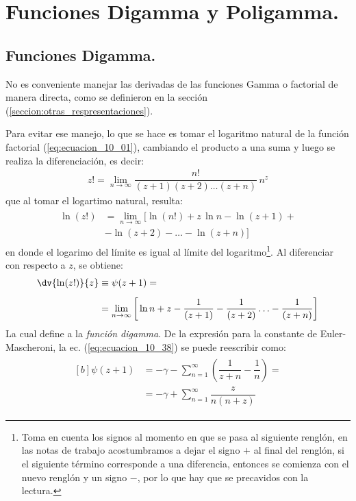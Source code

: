 \section{Funciones Digamma y Poligamma.}

\subsection{Funciones Digamma.}

No es conveniente manejar las derivadas de las funciones Gamma o factorial de manera directa, como se definieron en la sección (\ref{seccion:otras_respresentaciones}).
\par
Para evitar ese manejo, lo que se hace es tomar el logaritmo natural de la función factorial (\ref{eq:ecuacion_10_01}), cambiando el producto a una suma y luego se realiza la diferenciación, es decir:
\begin{align}
z! = \lim_{n \to \infty} \dfrac{n!}{(z + 1)(z + 2) \ldots (z + n)} \, n^{z}
\label{eq:ecuacion_10_36}
\end{align}
que al tomar el logartimo natural, resulta:
\begin{align}
\begin{aligned}
\ln (z!) &= \lim_{n \to \infty} \big[ \ln (n!) + z \, \ln n - \ln (z + 1) + \\[0.5em]
&- \ln (z + 2) - \ldots - \ln (z + n) \big]
\end{aligned}
\label{eq:ecuacion_10_37}
\end{align}
en donde el logarimo del límite es igual al límite del logaritmo\footnote{Toma en cuenta los signos al momento en que se pasa al siguiente renglón, en las notas de trabajo acostumbramos a dejar el signo $+$ al final del renglón, si el siguiente término corresponde a una diferencia, entonces se comienza con el nuevo renglón y un signo $-$, por lo que hay que se precavidos con la lectura.}. Al diferenciar con respecto a $z$, se obtiene:
\begin{align}
\begin{aligned}[b]
\dv{\ln (z!)}{z} &\equiv \psi(z + 1) = \\[0.5em]
&=\lim_{n \to \infty} \bigg[ \ln n + z - \dfrac{1}{(z + 1)} - \dfrac{1}{(z + 2)} \ldots - \dfrac{1}{(z + n)} \bigg]
\end{aligned}
\label{eq:ecuacion_10_38}
\end{align}
La cual define a la \emph{función digamma}. De la expresión para la constante de Euler-Mascheroni, la ec. (\ref{eq:ecuacion_10_38}) se puede reescribir como:
\begin{align}
\begin{aligned}[b]
\psi (z + 1) &= - \gamma - \sum_{n=1}^{\infty} \left( \dfrac{1}{z + n} - \dfrac{1}{n} \right) = \\[0.5em]
&= -\gamma + \sum_{n=1}^{\infty} \dfrac{z}{n (n + z)}
\end{aligned}
\label{eq:ecuacion_10_39}
\end{align}

